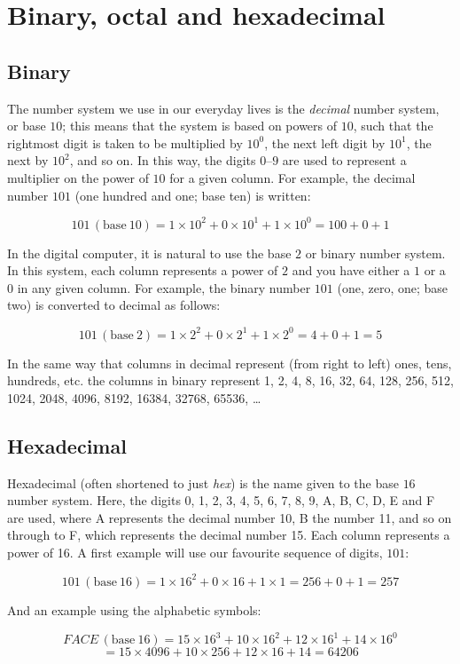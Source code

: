 \documentclass[a4paper]{scrartcl}
\newcommand{\decimal}{\ensuremath{\,(\mathrm{base}~10)}}
\newcommand{\binary}{\ensuremath{\,(\mathrm{base}~2)}}
\newcommand{\hex}{\ensuremath{\,(\mathrm{base}~16)}}
\begin{document}
\appendix
\section{Binary, octal and hexadecimal}\label{bin-oct-hex}
\subsection{Binary}
The number system we use in our everyday lives is the \emph{decimal} number system, or base $10$; this means that the system is based on powers of $10$, such that the rightmost digit is taken to be multiplied by $10^0$, the next left digit by $10^1$, the next by $10^2$, and so on. In this way, the digits $0$--$9$ are used to represent a multiplier on the power of $10$ for a given column. For example, the decimal number $101$ (one hundred and one; base ten) is written:

\[ 101 \decimal = 1\times10^2 + 0\times10^1 + 1\times10^0 = 100 + 0 + 1\]

In the digital computer, it is natural to use the base $2$ or binary number system. In this system, each column represents a power of $2$ and you have either a $1$ or a $0$ in any given column. For example, the binary number $101$ (one, zero, one; base two) is converted to decimal as follows:

\[ 101 \binary = 1\times2^2 + 0\times2^1 + 1\times2^0 = 4 + 0 +  1 = 5 \]

In the same way that columns in decimal represent (from right to left) ones, tens, hundreds, etc. the columns in binary represent 1, 2, 4, 8, 16, 32, 64, 128, 256, 512, 1024, 2048, 4096, 8192, 16384, 32768, 65536, \ldots

\subsection{Hexadecimal}
Hexadecimal (often shortened to just \emph{hex}) is the name given to the base $16$ number system. Here, the digits 0, 1, 2, 3, 4, 5, 6, 7, 8, 9, A, B, C, D, E and F are used, where A represents the decimal number 10, B the number 11, and so on through to F, which represents the decimal number 15. Each column represents a power of 16. A first example will use our favourite sequence of digits, $101$:

\[ 101\hex = 1\times16^2 + 0\times16 + 1\times1 = 256 + 0 + 1 = 257 \]

And an example using the alphabetic symbols:

\[ FACE\hex = 15\times16^3 + 10\times16^2 + 12\times16^1 + 14\times16^0 \]
\[ = 15\times4096 + 10\times256 + 12\times16 + 14 = 64206 \]
\end{document}

